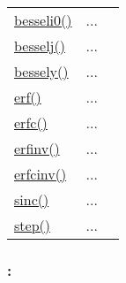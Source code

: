 \textcolor{blue}{}\begin{tabular}{>{\raggedleft}p{3cm}>{\centering}p{0.5cm}l}
\textcolor{blue}{\hyperlink{besseli0}{besseli0()}}&
...&
 \begin{NoHyper} \nameref{par:Modified-Bessel-function} \end{NoHyper}\tabularnewline
\textcolor{blue}{\hyperlink{besselj}{besselj()}}&
...&
 \begin{NoHyper} \nameref{par:Bessel-function} \end{NoHyper}\tabularnewline
\textcolor{blue}{\hyperlink{bessely}{bessely()}}&
...&
 \begin{NoHyper} \nameref{par:Bessel2-function} \end{NoHyper}\tabularnewline
\textcolor{blue}{\hyperlink{erf}{erf()}}&
...&
 \begin{NoHyper} \nameref{par:Error-function} \end{NoHyper}\tabularnewline
\textcolor{blue}{\hyperlink{erfc}{erfc()}}&
...&
 \begin{NoHyper} \nameref{par:Complementary-error-function} \end{NoHyper}\tabularnewline
\textcolor{blue}{\hyperlink{erfinv}{erfinv()}}&
...&
 \begin{NoHyper} \nameref{par:Inverse-error-function} \end{NoHyper}\tabularnewline
\textcolor{blue}{\hyperlink{erfcinv}{erfcinv()}}&
...&
 \begin{NoHyper} \nameref{par:Inverse-complementary-error} \end{NoHyper}\tabularnewline
\textcolor{blue}{\hyperlink{sinc}{sinc()}}&
...&
 \begin{NoHyper} \nameref{par:Sinc-function} \end{NoHyper}\tabularnewline
\textcolor{blue}{\hyperlink{step}{step()}}&
...&
 \begin{NoHyper} \nameref{par:Step-function} \end{NoHyper}\tabularnewline
\end{tabular}


\subsubsection*{: }


